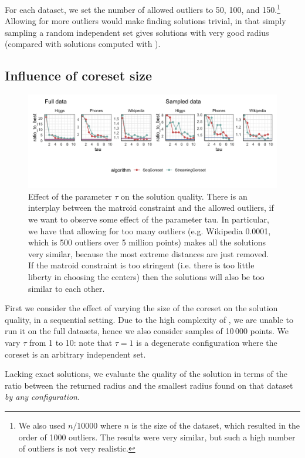 For each dataset, we set the number of allowed outliers to 50, 100, and 150.\footnote{We also used $n/10000$ where $n$ is the size of the dataset, which resulted in the order of 1000 outliers. The results were very similar, but such a high number of outliers is not very realistic.}
Allowing for more outliers would make finding solutions trivial, in that simply sampling a random independent set
gives solutions with very good radius (compared with solutions computed with \chen).

\subsection{Influence of coreset size}
\label{sec:exp:coreset-size}

\begin{figure}
    \includegraphics[width=\textwidth]{seq-effect-50}
    \caption{
        \label{fig:seq-effect}
        Effect of the parameter $\tau$ on the solution quality.
        There is an interplay between the matroid constraint and the allowed outliers, if we want to observe some effect of the parameter tau.
        In particular, we have that allowing for too many outliers (e.g. Wikipedia 0.0001, which is 500 outliers over 5 million points) makes all the solutions very similar, because the most extreme distances are just removed.
        If the matroid constraint is too stringent (i.e. there is too little liberty in choosing the centers)
        then the solutions will also be too similar to each other.
    }
\end{figure}

First we consider the effect of varying the size of the coreset on the solution quality, in a sequential setting.
Due to the high complexity of \chen, we are unable to run it on the
full datasets, hence we also consider samples of 10\,000 points.
We vary $\tau$ from 1 to 10: note that $\tau=1$ is a degenerate configuration where the coreset is an arbitrary independent set.

Lacking exact solutions,
we evaluate the quality of the solution in terms of the ratio between the returned radius
and the smallest radius found on that dataset \emph{by any configuration}.

